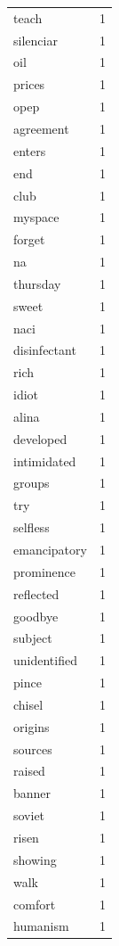 \begin{tabular}{lr}
teach & 1 \\
silenciar & 1 \\
oil & 1 \\
prices & 1 \\
opep & 1 \\
agreement & 1 \\
enters & 1 \\
end & 1 \\
club & 1 \\
myspace & 1 \\
forget & 1 \\
na & 1 \\
thursday & 1 \\
sweet & 1 \\
naci & 1 \\
disinfectant & 1 \\
rich & 1 \\
idiot & 1 \\
alina & 1 \\
developed & 1 \\
intimidated & 1 \\
groups & 1 \\
try & 1 \\
selfless & 1 \\
emancipatory & 1 \\
prominence & 1 \\
reflected & 1 \\
goodbye & 1 \\
subject & 1 \\
unidentified & 1 \\
pince & 1 \\
chisel & 1 \\
origins & 1 \\
sources & 1 \\
raised & 1 \\
banner & 1 \\
soviet & 1 \\
risen & 1 \\
showing & 1 \\
walk & 1 \\
comfort & 1 \\
humanism & 1 \\
\bottomrule
\end{tabular}
